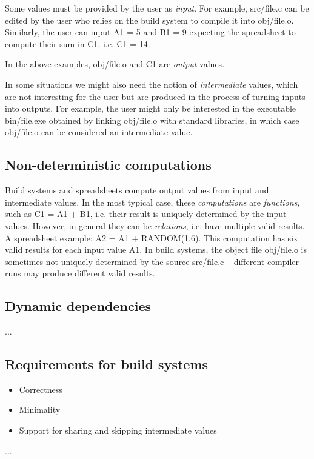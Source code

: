 Some values must be provided by the user as \emph{input}. For example,
\textsf{src/file.c} can be edited by the user who relies on the build system to
compile it into \textsf{obj/file.o}. Similarly, the user can input \textsf{A1 = 5}
and \textsf{B1 = 9} expecting the spreadsheet to compute their sum in \textsf{C1},
i.e. \textsf{C1 = 14}.

In the above examples, \textsf{obj/file.o} and \textsf{C1} are \emph{output} values.

In some situations we might also need the notion of \emph{intermediate} values,
which are not interesting for the user but are produced in the process of turning
inputs into outputs. For example, the user might only be interested in the
executable \textsf{bin/file.exe} obtained by linking \textsf{obj/file.o} with
standard libraries, in which case \textsf{obj/file.o} can be considered an
intermediate value.

\subsection{Non-deterministic computations}

Build systems and spreadsheets compute output values from input and intermediate
values. In the most typical case, these \emph{computations} are \emph{functions},
such as \textsf{C1 = A1 + B1}, i.e. their result is uniquely determined by the
input values. However, in general they can be \emph{relations}, i.e. have
multiple valid results. A spreadsheet example: \textsf{A2 = A1 + RANDOM(1,6)}.
This computation has six valid results for each input value \textsf{A1}. In
build systems, the object file \textsf{obj/file.o} is sometimes not uniquely
determined by the source \textsf{src/file.c} -- different compiler runs may
produce different valid results.

\subsection{Dynamic dependencies}

...


\subsection{Requirements for build systems}

\begin{itemize}
    \item Correctness
    \item Minimality
    \item Support for sharing and skipping intermediate values
\end{itemize}
...
